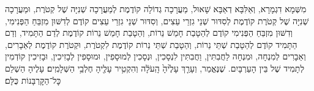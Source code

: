 \documentclass[twoside, openany, parskip=half, 11pt]{book}
\begin{document}

\tamid

\ketoret



  מִשְּׁמָא דִגְמָרָא, וְאַלִּבָּא דְאַבָּא שָׁאוּל, מַעֲרָכָה גְדוֹלָה קוֹדֶמֶת לְמַעֲרָכָה שְׁנִיָּה שֶׁל קְטֹרֶת, וּמַעֲרָכָה שְׁנִיָּה שֶׁל קְטֹרֶת קוֹדֶמֶת לְסִדּוּר שְׁנֵי גִזְרֵי עֵצִים, וְסִדּוּר שְׁנֵי גִזְרֵי עֵצִים קוֹדֶם לְדִשּׁוּן מִזְבֵּחַ הַפְּנִימִי, וְדִשּׁוּן מִזְבֵּחַ הַפְּנִימִי קוֹדֶם לְהַטָבַת חָמֵשׁ נֵרוֹת, וְהַטָבַת חָמֵשׁ נֵרוֹת קוֹדֶמֶת לְדַם הַתָּמִיד, וְדַם הַתָּמִיד קוֹדֶם לְהַטָבַת שְׁתֵּי נֵרוֹת, וְהַטָבַת שְׁתֵּי נֵרוֹת קוֹדֶמֶת לִקְטֹרֶת, וּקְטֹרֶת קוֹדֶמֶת לְאֵבָרִים, וְאֵבָרִים לְמִנְחָה, וּמִנְחָה לַחֲבִתִּין, וַחֲבִתִּין לִנְסָכִין, וּנְסָכִין לְמוּסָפִין, וּמוּסָפִין לְבָזִיכִין, וּבָזִיכִין קוֹדְמִין לְתָמִיד שֶׁל בֵּין הָעַרְבָּיִם. שֶׁנֶּאֱמַר, וְעָרַ֤ךְ  עָלֶ֙יהָ֙ הָֽעֹלָ֔ה וְהִקְטִ֥יר עָלֶ֖יהָ חֶלְבֵ֥י הַשְּׁלָמִֽים׃ עָלֶיהָ הַשְׁלֵם כׇּל־הַקׇּרְבָּנוֹת כֻּלָּם׃
\end{document}

